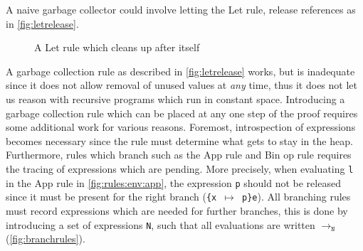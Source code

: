 A naive garbage collector could involve letting the Let rule, release references as in \autoref{fig:letrelease}. 
\begin{figure}[ht]
  \begin{mdframed}
    \begin{prooftree}
    \end{prooftree}   
  \end{mdframed}
  \caption{A Let rule which cleans up after itself}
  \label{fig:letrelease}
\end{figure}
A garbage collection rule as described in \autoref{fig:letrelease} works, but is inadequate since it does not allow removal of unused values at \textit{any} time, thus it does not let us reason with recursive programs which run in constant space.
Introducing a garbage collection rule which can be placed at any one step of the proof requires some additional work for various reasons.
Foremost, introspection of expressions becomes necessary since the rule must determine what gets to stay in the heap.
Furthermore, rules which branch such as the App rule and Bin op rule requires the tracing of expressions which are pending.
More precisely, when evaluating \texttt{l} in the App rule in \autoref{fig:rules:env:app}, the expression \texttt{p} should not be released since it must be present for the right branch (\texttt{\{x $\mapsto$ p\}e}).
All branching rules must record expressions which are needed for further branches, this is done by introducing a set of expressions \texttt{N}, such that all evaluations are written $\rightarrow_{\texttt{N}}$ (\autoref{fig:branchrules}).

